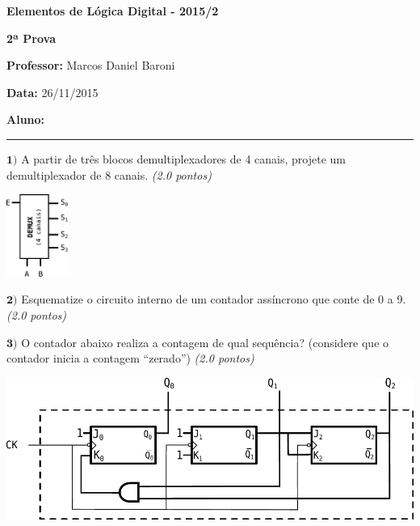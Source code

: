 \documentclass[12pt]{article}
\newcommand{\exerc}[3]{ \vspace*{25pt} {$\mathbf{#1)}$} #2 \hfill {\it #3} }
\begin{document}

\begin{center}
{\Large \bf Elementos de Lógica Digital - 2015/2}
\end{center}
\vspace{2pt}

{\large \bf 2ª Prova}

{\bf Professor:} Marcos Daniel Baroni

{\bf Data:} 26/11/2015

\vspace{2pt}
{\bf Aluno:} \rule[-2mm]{130mm}{1pt}

\exerc{1}{A partir de três blocos demultiplexadores de 4 canais, projete um
  demultiplexador de 8 canais.}{(2.0 pontos)}
  \begin{center}
    \includegraphics[width=20mm]{demux4}
  \end{center}

\vspace{-14pt}
\exerc{2}{Esquematize o circuito interno de um contador assíncrono que conte de 0 a 9.}{(2.0 pontos)}

\exerc{3}{O contador abaixo realiza a contagem de qual sequência? (considere que
   o contador inicia a contagem ``zerado'')}{(2.0 pontos)}
\begin{center}
  \includegraphics[scale=0.8]{cont2} \\ \vspace{15pt}
\end{center}
\end{document}
